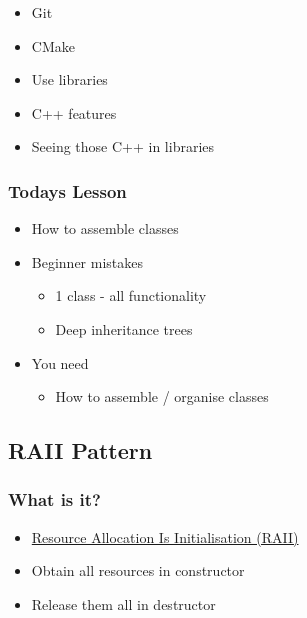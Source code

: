 \begin{itemize}
\itemsep1pt\parskip0pt
\item
  Git
\item
  CMake
\item
  Use libraries
\item
  C++ features
\item
  Seeing those C++ in libraries
\end{itemize}

\subsubsection{Todays Lesson}\label{todays-lesson-2}

\begin{itemize}
\itemsep1pt\parskip0pt
\item
  How to assemble classes
\item
  Beginner mistakes

  \begin{itemize}
  \itemsep1pt\parskip0pt
  \item
    1 class - all functionality
  \item
    Deep inheritance trees
  \end{itemize}
\item
  You need

  \begin{itemize}
  \itemsep1pt\parskip0pt
  \item
    How to assemble / organise classes
  \end{itemize}
\end{itemize}

\subsection{RAII Pattern}\label{raii-pattern}

\subsubsection{What is it?}\label{what-is-it}

\begin{itemize}
\itemsep1pt\parskip0pt
\item
  \href{https://en.wikipedia.org/wiki/Resource_Acquisition_Is_Initialization}{Resource
  Allocation Is Initialisation (RAII)}
\item
  Obtain all resources in constructor
\item
  Release them all in destructor
\end{itemize}

